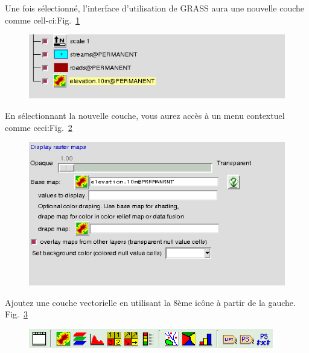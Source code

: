 Une fois s\'electionn\'e, l'interface d'utilisation de GRASS aura une nouvelle couche comme cell-ci:Fig.~\ref{fig:grass004}

\begin{figure}[htbp]
   \centering
   \includegraphics[scale=0.35]{grass004.png}
   \caption{}
   \label{fig:grass004}
\end{figure}

En s\'electionnant la nouvelle couche, vous aurez acc\`es \`a un menu contextuel comme ceci:Fig.~\ref{fig:grass005}

\begin{figure}[htbp]
   \centering
   \includegraphics[scale=0.35]{grass005.png}
   \caption{}
   \label{fig:grass005}
\end{figure}

Ajoutez une couche vectorielle en utilisant la 8\`eme ic\^one \`a partir de la gauche. Fig.~\ref{fig:grass006}

\begin{figure}[htbp]
   \centering
   \includegraphics[scale=0.5]{grass006.png}
   \caption{}
   \label{fig:grass006}
\end{figure}

